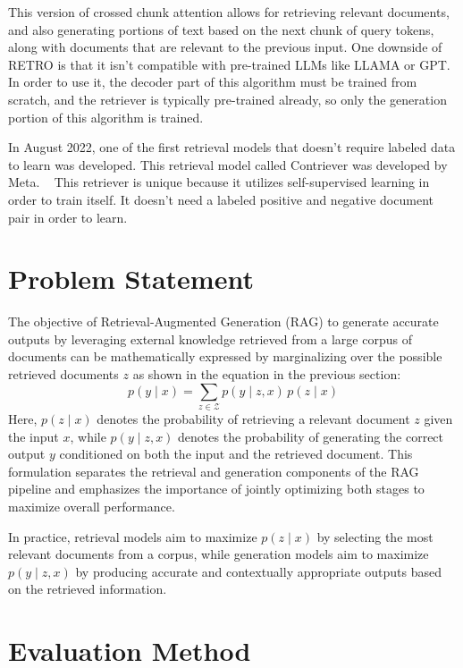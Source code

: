 \documentclass[twocolumn, 10pt]{article}
\begin{document}
This version of crossed chunk attention allows for retrieving relevant documents, and also generating portions of text based on the next chunk of query tokens, along with documents that are relevant to the previous input.
One downside of RETRO is that it isn't compatible with pre-trained LLMs like LLAMA or GPT. In order to use it, the decoder part of this algorithm must be trained from scratch, and the retriever is typically pre-trained already, so only the generation portion of this algorithm is trained.

In August 2022, one of the first retrieval models that doesn't require labeled data to learn was developed. This retrieval model called Contriever was developed by Meta. ~\cite{izacard2022unsupervised} This retriever is unique because it utilizes self-supervised learning in order to train itself.
It doesn't need a labeled positive and negative document pair in order to learn.

\section{Problem Statement}
The objective of Retrieval-Augmented Generation (RAG) to generate accurate outputs by leveraging external knowledge retrieved from a large corpus of documents can be mathematically expressed by marginalizing over the possible retrieved documents \( z \) as shown in the equation in the previous section:
\begin{equation*}
p(y \mid x) = \sum_{z \in \mathcal{Z}} p(y \mid z, x) \, p(z \mid x)
\end{equation*}
Here, \( p(z \mid x) \) denotes the probability of retrieving a relevant document \( z \) given the input \( x \), while \( p(y \mid z, x) \) denotes the probability of generating the correct output \( y \) conditioned on both the input and the retrieved document. This formulation separates the retrieval and generation components of the RAG pipeline and emphasizes the importance of jointly optimizing both stages to maximize overall performance.

In practice, retrieval models aim to maximize \( p(z \mid x) \) by selecting the most relevant documents from a corpus, while generation models aim to maximize \( p(y \mid z, x) \) by producing accurate and contextually appropriate outputs based on the retrieved information.

\section{Evaluation Method}
\end{document}
